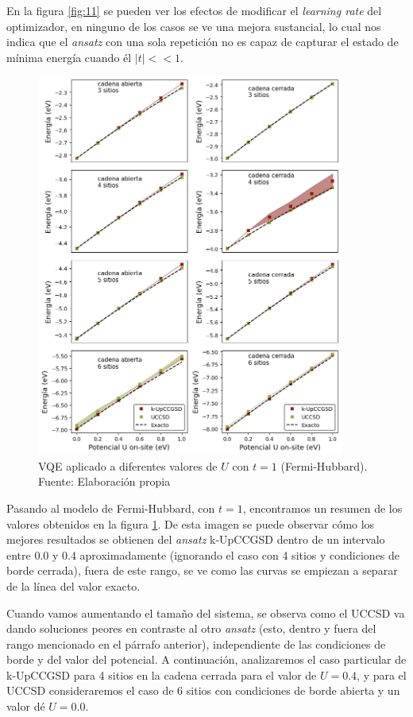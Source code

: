 En la figura \ref{fig:11} se pueden ver los efectos de modificar el \textit{learning rate} del optimizador, en ninguno de los casos se ve una mejora sustancial, lo cual nos indica que el \textit{ansatz} con una sola repetición no es capaz de capturar el estado de mínima energía cuando él $|t|<< 1$.

\begin{figure}[H]
\centering
\includegraphics[width=0.9\textwidth]{figures/S4/fermi/barridofh.png}
\caption{\label{fig:7} VQE aplicado a diferentes valores de $U$ con $t=1$ (Fermi-Hubbard). Fuente: Elaboración propia}
\end{figure}

Pasando al modelo de Fermi-Hubbard, con $t=1$, encontramos un resumen de los valores obtenidos en la figura \ref{fig:7}. De esta imagen se puede observar cómo los mejores resultados se obtienen del \textit{ansatz}  k-UpCCGSD dentro de un intervalo entre 0.0 y 0.4 aproximadamente (ignorando el caso con 4 sitios y condiciones de borde cerrada), fuera de este rango, se ve como las curvas se empiezan a separar de la línea del valor exacto.

Cuando vamos aumentando el tamaño del sistema, se observa como el UCCSD va dando soluciones peores en contraste al otro \textit{ansatz} (esto, dentro y fuera del rango mencionado en el párrafo anterior), independiente de las condiciones de borde y del valor del potencial. A continuación, analizaremos el caso particular de k-UpCCGSD para 4 sitios en la cadena cerrada para el valor de $U=0.4$, y para el UCCSD consideraremos el caso de 6 sitios con condiciones de borde abierta y un valor dé $U=0.0$.

